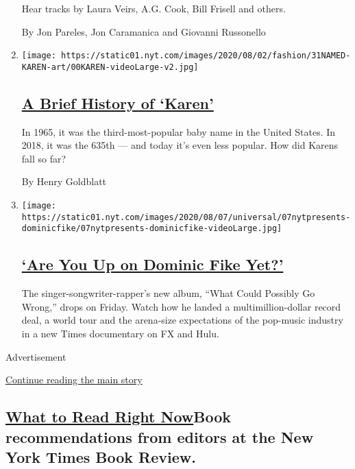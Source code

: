 \begin{enumerate}
  Hear tracks by Laura Veirs, A.G. Cook, Bill Frisell and others.

  By Jon Pareles, Jon Caramanica and Giovanni Russonello
\item
  \texttt{[image: https://static01.nyt.com/images/2020/08/02/fashion/31NAMED-KAREN-art/00KAREN-videoLarge-v2.jpg]}

  \hypertarget{a-brief-history-of-karen}{%
  \subsection{\texorpdfstring{\href{/2020/07/31/style/karen-name-meme-history.html}{A
  Brief History of
  `Karen'}}{A Brief History of `Karen'}}\label{a-brief-history-of-karen}}

  In 1965, it was the third-most-popular baby name in the United States.
  In 2018, it was the 635th --- and today it's even less popular. How
  did Karens fall so far?

  By Henry Goldblatt
\item
  \texttt{[image: https://static01.nyt.com/images/2020/08/07/universal/07nytpresents-dominicfike/07nytpresents-dominicfike-videoLarge.jpg]}

  \hypertarget{are-you-up-on-dominic-fike-yet}{%
  \subsection{\texorpdfstring{\href{/article/dominic-fike-at-first.html}{`Are
  You Up on Dominic Fike
  Yet?'}}{`Are You Up on Dominic Fike Yet?'}}\label{are-you-up-on-dominic-fike-yet}}

  The singer-songwriter-rapper's new album, ``What Could Possibly Go
  Wrong,'' drops on Friday. Watch how he landed a multimillion-dollar
  record deal, a world tour and the arena-size expectations of the
  pop-music industry in a new Times documentary on FX and Hulu.
\end{enumerate}

Advertisement

\protect\hyperlink{after-mid2}{Continue reading the main story}

\hypertarget{what-to-read-right-nowbook-recommendations-from-editors-at-the-new-york-times-book-review}{%
\subsection{\texorpdfstring{\href{/spotlight/books-to-read}{What to Read
Right Now}Book recommendations from editors at the New York Times Book
Review.}{What to Read Right NowBook recommendations from editors at the New York Times Book Review.}}\label{what-to-read-right-nowbook-recommendations-from-editors-at-the-new-york-times-book-review}}

